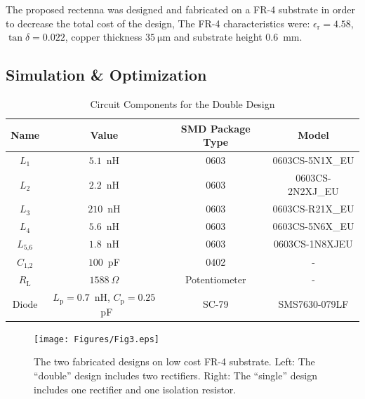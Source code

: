 \documentclass[journal]{IEEEtran}
\begin{document}
%
%
The proposed rectenna was designed and fabricated on a  FR-4  substrate in order to decrease the total cost of the design,
%
The FR-4 characteristics were: $\epsilon_\text{r}=4.58$, $\tan{}\delta=0.022$, copper thickness $35~\mathrm{\mu{}m}$ and substrate height $0.6$~mm.






\subsection{Simulation \& Optimization} 
\label{subsec:optimization}
%


\begin{table}[t]	
\renewcommand{\arraystretch}{1.1}
\centering
\caption{ Circuit Components  for the Double Design}
\scalebox{0.8}
{
\begin{tabular}{c||c||c||c}
\hline
\hline
 Name & Value & SMD Package Type & Model\\
\hline
\hline
$L_\text{1}$&$5.1$~nH & 0603 & 0603CS-5N1X\_EU \\
\hline
$L_\text{2}$&$2.2$~nH & 0603 & 0603CS-2N2XJ\_EU \\
\hline
$L_\text{3}$&$210$~nH & 0603 & 0603CS-R21X\_EU\\
\hline
$L_\text{4}$&$5.6$~nH & 0603 & 0603CS-5N6X\_EU\\
\hline
$L_\text{5,6}$&$1.8$~nH & 0603  & 0603CS-1N8XJEU\\
\hline
$C_\text{1,2}$&$100$~pF & 0402 & -\\
\hline
$R_\text{L}$&$1588~\Omega$ & Potentiometer &-\\
\hline
$\text{Diode}$& $L_\text{p}=0.7$~nH, $C_\text{p}=0.25$~pF  &  SC-79  & SMS7630-079LF\\

\hline
\hline
\end{tabular}
}
\label{tab:components}
\end{table}

\begin{figure}[t]
\centering
\texttt{[image: Figures/Fig3.eps]}
\caption{The two fabricated designs on low cost FR-4 substrate. Left:  The ``double'' design includes two rectifiers. Right: The ``single'' design includes one rectifier  and one isolation resistor.}
\label{fig:3}
\end{figure}
\end{document}
